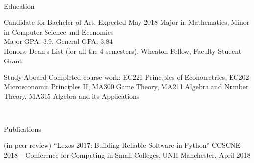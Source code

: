 \documentclass[]{resume-knyte}
\begin{document}



\begin{subheader}{1}
    \\

\end{subheader}

\begin{topic}{Education}


    {Candidate for Bachelor of Art, Expected May 2018}
    {Major in Mathematics, Minor in Computer Science and Economics\\
    Major GPA: 3.9, General GPA: 3.84\\
    Honors: Dean's List (for all the 4 semesters), Wheaton Fellow, Faculty Student Grant.}


    {Study Aboard}
    {Completed course work: EC221 Principles of Econometrics, EC202 Microeconomic Principles II,
    MA300 Game Theory, MA211 Algebra and Number Theory, MA315 Algebra and its Applications
    }

    \\ %
\end{topic}


\begin{topic}{Publications}


    {(in peer review)}
    {``Lexos 2017: Building Reliable Software in Python''}
    {CCSCNE 2018 – Conference for Computing in Small Colleges, UNH-Manchester, April 2018}

    \\
\end{topic}
\end{document}
